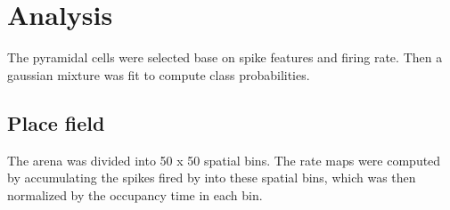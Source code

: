 \section{Analysis}
\label{analysis}


The pyramidal cells were selected base on spike features and firing rate. 
Then a gaussian mixture was fit to compute class probabilities.

\subsection{Place field}
The arena was divided into 50 x 50 spatial bins. The rate maps were computed by accumulating the spikes fired by into these spatial bins, which was then normalized by the occupancy time in each bin. 






	